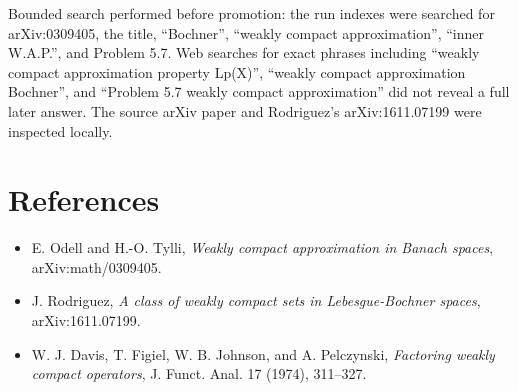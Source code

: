 \documentclass[11pt]{article}
\begin{document}
Bounded search performed before promotion: the run indexes were searched for arXiv:0309405, the title, ``Bochner'', ``weakly compact approximation'', ``inner W.A.P.'', and Problem 5.7.  Web searches for exact phrases including ``weakly compact approximation property Lp(X)'', ``weakly compact approximation Bochner'', and ``Problem 5.7 weakly compact approximation'' did not reveal a full later answer.  The source arXiv paper and Rodriguez's arXiv:1611.07199 were inspected locally.

\section{References}

\begin{itemize}
\item E. Odell and H.-O. Tylli, \emph{Weakly compact approximation in Banach spaces}, arXiv:math/0309405.
\item J. Rodriguez, \emph{A class of weakly compact sets in Lebesgue-Bochner spaces}, arXiv:1611.07199.
\item W. J. Davis, T. Figiel, W. B. Johnson, and A. Pelczynski, \emph{Factoring weakly compact operators}, J. Funct. Anal. 17 (1974), 311--327.
\end{itemize}
\end{document}
